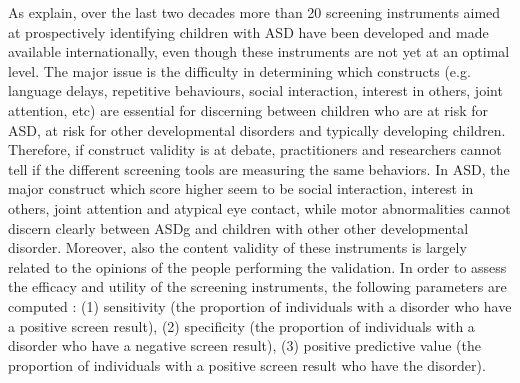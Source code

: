 As \cite{maganto2017screening} explain, over the last two decades more than 20 screening instruments aimed at prospectively identifying children with ASD have been developed and made available internationally, even though these instruments are not yet at an optimal level. The major issue is the difficulty in determining which constructs (e.g. language delays, repetitive behaviours, social interaction, interest in others, joint attention, etc) are essential for discerning between children who are at risk for ASD, at risk for other developmental disorders and typically developing children. Therefore, if construct validity is at debate, practitioners and researchers cannot tell if the different screening tools are measuring the same behaviors. In ASD, the major construct which score higher seem to be social interaction, interest in others, joint attention and atypical eye contact, while motor abnormalities cannot discern clearly between ASDg and children with other other developmental disorder. Moreover, also the content validity of these instruments is largely related to the opinions of the people performing the validation. In order to assess the efficacy and utility of the screening instruments, the following parameters are computed \citep{charman2013measuerement}: (1) sensitivity (the proportion of individuals with a disorder who have a positive screen result), (2) specificity (the proportion of individuals with a disorder who have a negative screen result), (3) positive predictive value (the proportion of individuals with a positive screen result who have the disorder).

